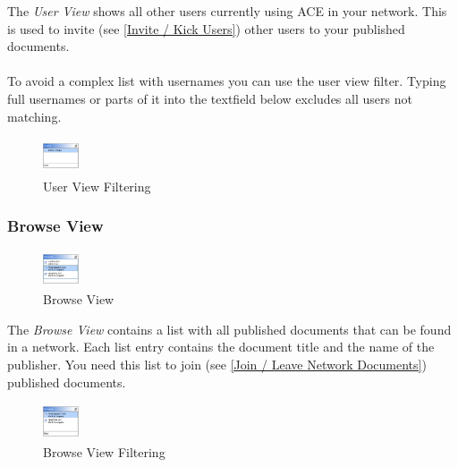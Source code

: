 \documentclass[11pt,a4paper]{article}
\begin{document}
The \textit{User View} shows all other users currently using ACE in your network. This is used to invite (see \ref{Invite / Kick Users}) other users to your published documents. \\
\\
To avoid a complex list with usernames you can use the user view filter. Typing full usernames or parts of it into the textfield below excludes all users not matching.

\begin{figure}[H]
\begin{center}
  \includegraphics[height=30pt, width=30pt]{../images/usermanual/uview_filtering.bmp.eps}
\caption{User View Filtering}
\label{default}
\end{center}
\end{figure}

\subsubsection{Browse View}

\begin{figure}[H]
\begin{center}
  \includegraphics[height=30pt, width=30pt]{../images/usermanual/bview_overview.bmp.eps}
\caption{Browse View}
\label{default}
\end{center}
\end{figure}

The \textit{Browse View} contains a list with all published documents that can be found in a network. Each list entry contains the document title and the name of the publisher. You need this list to join (see \ref{Join / Leave Network Documents}) published documents.

\begin{figure}[H]
\begin{center}
  \includegraphics[height=30pt, width=30pt]{../images/usermanual/bview_filtering.bmp.eps}
\caption{Browse View Filtering}
\label{default}
\end{center}
\end{figure}
\end{document}
